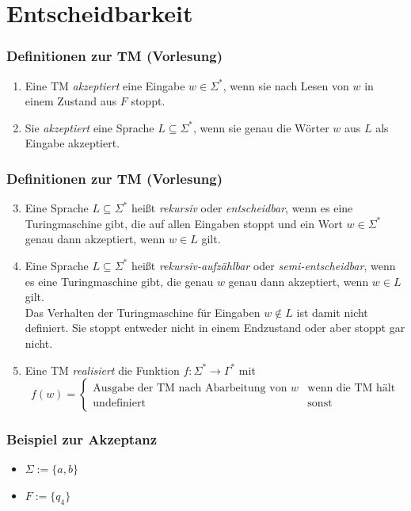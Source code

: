\section{Entscheidbarkeit}
\begin{frame}
 \frametitle{Definitionen zur TM (Vorlesung)}
 \begin{enumerate}
  \item Eine TM \emph{akzeptiert} eine Eingabe $w \in \Sigma^*$, wenn sie nach Lesen von $w$ in einem Zustand aus $F$ stoppt.
  \item Sie \emph{akzeptiert} eine Sprache $L \subseteq \Sigma^*$, wenn sie genau die Wörter $w$ aus $L$ als Eingabe akzeptiert.
\end{enumerate}
\end{frame}
\begin{frame}
 \frametitle{Definitionen zur TM (Vorlesung)}
 \begin{enumerate}
 \setcounter{enumi}{2}
 \item Eine Sprache $L \subseteq \Sigma^*$ heißt \emph{rekursiv} oder \emph{entscheidbar}, wenn es eine Turingmaschine gibt, die auf allen Eingaben stoppt und
	ein Wort $w \in \Sigma^*$ genau dann akzeptiert, wenn $w \in L$ gilt.
  \item Eine Sprache $L \subseteq \Sigma^*$ heißt \emph{rekursiv-aufzählbar} oder \emph{semi-entscheidbar}, wenn es eine Turingmaschine gibt, 
	die genau $w$ genau dann akzeptiert, wenn $w \in L$ gilt. \\ Das Verhalten der Turingmaschine für Eingaben $w \not\in L$ ist damit nicht definiert.
	Sie stoppt entweder nicht in einem Endzustand oder aber stoppt gar nicht.
	\item Eine TM \emph{realisiert} die Funktion $f: \Sigma^* \rightarrow \Gamma^*$ mit $$f(w) = \begin{cases} \text{Ausgabe der TM nach Abarbeitung von } w & \text{wenn die TM hält} \\ \text{undefiniert} & \text{sonst} \end{cases}$$
 \end{enumerate}
\end{frame}

\begin{frame}
 \frametitle{Beispiel zur Akzeptanz}
 \begin{itemize}
  \item $\Sigma := \{a, b\}$  
  \item $F := \{q_4\}$
  
  \ducttape{-1cm} 
  \thetm
 \end{itemize}
 
 \end{frame}

